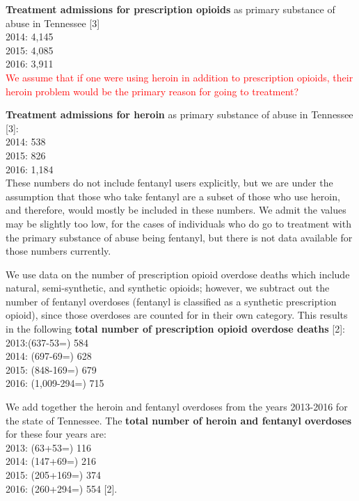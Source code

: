 \documentclass[12pt]{article}
\begin{document}
\textbf{Treatment admissions for prescription opioids} as primary substance of abuse in Tennessee [3] \\ %
2014: 4,145\\
2015: 4,085 \\
2016: 3,911 \\
\textcolor{red}{We assume that if one were using heroin in addition to prescription opioids, their heroin problem would be the primary reason for going to treatment?}

\textbf{Treatment admissions for heroin} as primary substance of abuse in Tennessee [3]:  \\
2014: 538 \\
2015: 826 \\
2016: 1,184 \\
These numbers do not include fentanyl users explicitly, but we are under the assumption that those who take fentanyl are a subset of those who use heroin, and therefore, would mostly be included in these numbers. We admit the values may be slightly too low, for the cases of individuals who do go to treatment with the primary substance of abuse being fentanyl, but there is not data available for those numbers currently. 

We use data on the number of prescription opioid overdose deaths which include natural, semi-synthetic, and synthetic opioids; however, we subtract out the number of fentanyl overdoses (fentanyl is classified as a synthetic prescription opioid), since those overdoses are counted for in their own category. This results in the following  \textbf{total number of prescription opioid overdose deaths} [2]: \\
2013:(637-53=) 584 \\
2014: (697-69=) 628 \\
2015: (848-169=) 679 \\
2016: (1,009-294=) 715  

We add together the heroin and fentanyl overdoses from the years 2013-2016 for the state of Tennessee. The \textbf{total number of heroin and fentanyl overdoses} for these four years are: \\
2013: (63+53=) 116 \\
2014: (147+69=) 216 \\
2015: (205+169=) 374 \\
2016: (260+294=) 554 [2]. 
\end{document}
